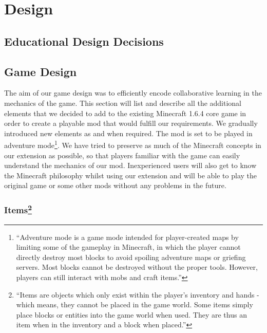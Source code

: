 \chapter{Design}
\label{ch:design}

\section{Educational Design Decisions}

\section{Game Design}
The aim of our game design was to efficiently encode collaborative learning in the mechanics of the game. This section will list and describe all the additional elements that we decided to add to the existing Minecraft 1.6.4 core game in order to create a playable mod that would fulfill our requirements. We gradually introduced new elements as and when required.
\newline\newline
The mod is set to be played in adventure mode\footnote{``Adventure mode is a game mode intended for player-created maps by limiting some of the gameplay in Minecraft, in which the player cannot directly destroy most blocks to avoid spoiling adventure maps or griefing servers. Most blocks cannot be destroyed without the proper tools. However, players can still interact with mobs and craft items.''\cite{website:minecraft-adventure}}.
We have tried to preserve as much of the Minecraft concepts in our extension as possible, so that players familiar with the game can easily understand the mechanics of our mod. Inexperienced users will also get to know the Minecraft philosophy whilst using our extension and will be able to play the original game or some other mods without any problems in the future.

\subsection[Items]{Items\footnote{``Items are objects which only exist within the player's inventory and hands - which means, they cannot be placed in the game world. Some items simply place blocks or entities into the game world when used. They are thus an item when in the inventory and a block when placed.''\cite{website:minecraft-item}}}

